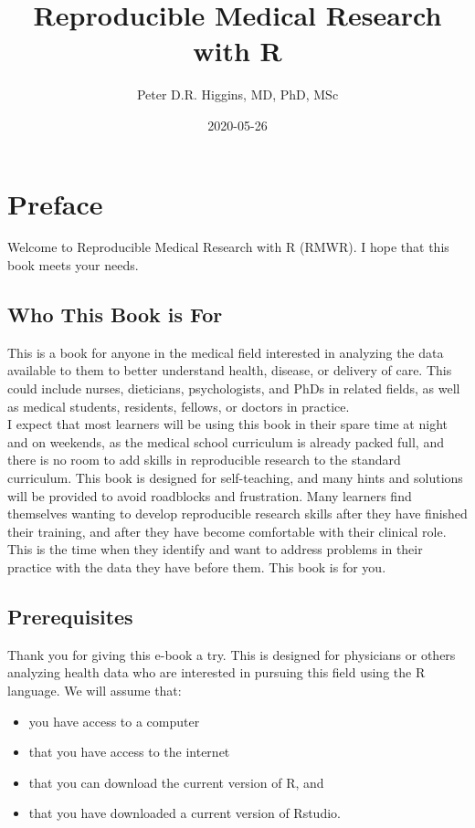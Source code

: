 \documentclass[
]{book}
\title{Reproducible Medical Research with R}
\author{Peter D.R. Higgins, MD, PhD, MSc}
\date{2020-05-26}
\providecommand{\tightlist}{%
  \setlength{\itemsep}{0pt}\setlength{\parskip}{0pt}}
\begin{document}
\maketitle

{
\setcounter{tocdepth}{1}
\tableofcontents
}
\hypertarget{preface}{%
\chapter{Preface}\label{preface}}

Welcome to Reproducible Medical Research with R (RMWR). I hope that this book meets your needs.

\hypertarget{who-this-book-is-for}{%
\section{Who This Book is For}\label{who-this-book-is-for}}

This is a book for anyone in the medical field interested in analyzing the data available to them to better understand health, disease, or delivery of care. This could include nurses, dieticians, psychologists, and PhDs in related fields, as well as medical students, residents, fellows, or doctors in practice.\\
I expect that most learners will be using this book in their spare time at night and on weekends, as the medical school curriculum is already packed full, and there is no room to add skills in reproducible research to the standard curriculum. This book is designed for self-teaching, and many hints and solutions will be provided to avoid roadblocks and frustration.
Many learners find themselves wanting to develop reproducible research skills after they have finished their training, and after they have become comfortable with their clinical role. This is the time when they identify and want to address problems in their practice with the data they have before them. This book is for you.

\hypertarget{prerequisites}{%
\section{Prerequisites}\label{prerequisites}}

Thank you for giving this e-book a try. This is designed for physicians or others analyzing health data who are interested in pursuing this field using the R language.
We will assume that:

\begin{itemize}
\tightlist
\item
  you have access to a computer
\item
  that you have access to the internet
\item
  that you can download the current version of R, and
\item
  that you have downloaded a current version of Rstudio.
\end{itemize}
\end{document}
